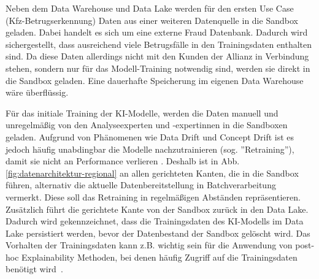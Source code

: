 Neben dem Data Warehouse und Data Lake werden für den ersten Use Case
(Kfz-Betrugserkennung) Daten aus einer weiteren Datenquelle in die Sandbox geladen.
Dabei handelt es sich um eine externe Fraud Datenbank.
Dadurch wird sichergestellt, dass ausreichend viele Betrugsfälle
in den Trainingsdaten enthalten sind.
Da diese Daten allerdings nicht mit den Kunden der Allianz
in Verbindung stehen, sondern nur für das Modell-Training notwendig sind,
werden sie direkt in die Sandbox geladen.
Eine dauerhafte Speicherung im eigenen Data Warehouse wäre überflüssig.

Für das initiale Training der KI-Modelle, 
werden die Daten manuell und unregelmäßig von den Analyseexperten und -expertinnen
in die Sandboxen geladen.
Aufgrund von Phänomenen wie Data Drift und Concept Drift
ist es jedoch häufig unabdingbar die Modelle nachzutrainieren (sog. ''Retraining''),
damit sie nicht an Performance verlieren \cite{ghosh2022}.
Deshalb ist in Abb. \ref{fig:datenarchitektur-regional} an allen gerichteten Kanten,
die in die Sandbox führen,
alternativ die aktuelle Datenbereitstellung in Batchverarbeitung vermerkt.
Diese soll das Retraining in regelmäßigen Abständen repräsentieren. 
Zusätzlich führt die gerichtete Kante von der Sandbox
zurück in den Data Lake.
Dadurch wird gekennzeichnet, dass die Trainingsdaten des KI-Modells
im Data Lake persistiert werden, bevor der Datenbestand der Sandbox gelöscht wird.
Das Vorhalten der Trainingsdaten kann z.B. wichtig sein für
die Anwendung von post-hoc Explainability Methoden, 
bei denen häufig Zugriff auf die Trainingsdaten benötigt wird~\cite{pintelas2020}.
